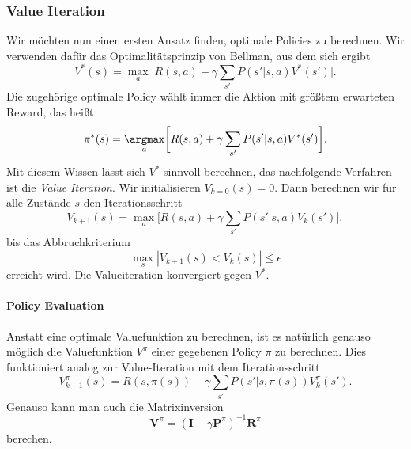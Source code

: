 
\subsubsection{Value Iteration}
Wir möchten nun einen ersten Ansatz finden, optimale Policies zu berechnen.
Wir verwenden dafür das Optimalitätsprinzip von Bellman, aus dem sich ergibt
\begin{equation*}
	V^\ast(s)=\max_a\bigg[R(s,a)+\gamma\sum_{s'}P(s'|s,a)V^\ast(s')\bigg].
\end{equation*}
Die zugehörige optimale Policy wählt immer die Aktion mit größtem erwarteten Reward, das heißt
\begin{equation*}
	\pi^\ast(s)=\underset a\argmax \bigg[R(s,a)+\gamma\sum_{s'}P(s'|s,a)V^\ast(s')\bigg].
\end{equation*}
Mit diesem Wissen lässt sich $V^\ast$ sinnvoll berechnen, das nachfolgende Verfahren ist die \emph{Value Iteration}.
Wir initialisieren $V_{k=0}(s)=0$. Dann berechnen wir für alle Zustände $s$ den Iterationsschritt
\begin{equation*}
	V_{k+1}(s)=\max_a\bigg[R(s,a)+\gamma\sum_{s'}P(s'|s,a)V_k(s')\bigg],
\end{equation*} 
bis das Abbruchkriterium
\begin{equation*}
	\max_s|V_{k+1}(s)<V_k(s)|\leq \epsilon
\end{equation*}
erreicht wird.
Die Valueiteration konvergiert gegen $V^\ast$.

\paragraph{Policy Evaluation}\label{policyEvaluation}
Anstatt eine optimale Valuefunktion zu berechnen, ist es natürlich genauso möglich die Valuefunktion $V^\pi$ einer gegebenen Policy $\pi$ zu berechnen. Dies funktioniert analog zur Value-Iteration mit dem Iterationsschritt
\begin{equation*}
	V_{k+1}^\pi(s)=R(s,\pi(s))+\gamma\sum_{s'}P(s'|s,\pi(s))V_k^\pi(s').
\end{equation*}
Genauso kann man auch die Matrixinversion
\begin{equation*}
	\mathbf V^\pi=(\mathbf I-\gamma\mathbf P^\pi)^{-1}\mathbf R^\pi
\end{equation*}
berechen.

